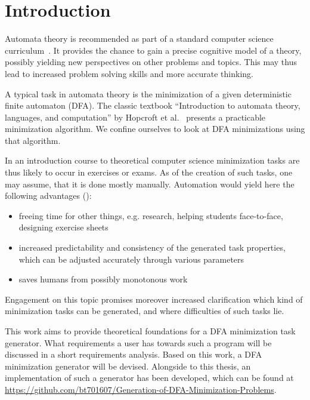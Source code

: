 
\chapter{Introduction} \label{ch:1}


Automata theory is recommended as part of a standard computer science curriculum~\cite[pp. 5-6]{GI16}. It provides the chance to gain a precise cognitive model of a theory, possibly yielding new perspectives on other problems and topics. This may thus lead to increased problem solving skills and more accurate thinking.


A typical task in automata theory is the minimization of a given deterministic finite automaton (DFA). The classic textbook ``Introduction to automata theory, languages, and computation'' by Hopcroft et al.~\cite{HMU01} presents a practicable minimization algorithm. We confine ourselves to look at DFA minimizations using that algorithm.


In an introduction course to theoretical computer science minimization tasks are thus likely to occur in exercises or exams. As of the creation of such tasks, one may assume, that it is done mostly manually. Automation would yield here the following advantages (\cite[pp. 1-4]{Lam13}):
\begin{itemize}
	\item freeing time for other things, e.g. research, helping students face-to-face, designing exercise sheets
	
	\item increased predictability and consistency of the generated task properties, which can be adjusted accurately through various parameters
	
	\item saves humans from possibly monotonous work
\end{itemize}
Engagement on this topic promises moreover increased clarification which kind of minimization tasks can be generated, and where difficulties of such tasks lie.

This work aims to provide theoretical foundations for a DFA minimization task generator. What requirements a user has towards such a program will be discussed in a short requirements analysis. Based on this work, a DFA minimization generator will be devised. Alongside to this thesis, an implementation of such a generator has been developed, which can be found at \url{https://github.com/bt701607/Generation-of-DFA-Minimization-Problems}.
